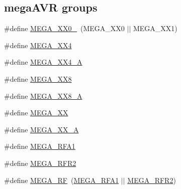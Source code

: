 \subsection*{mega\+A\+V\+R groups}
\begin{DoxyCompactItemize}
\item 
\#define \hyperlink{group__mega__part__macros__group_ga59ba73abcf65d3d398e7d37d78c271fe}{M\+E\+G\+A\+\_\+\+X\+X0\+\_}~(M\+E\+G\+A\+\_\+\+X\+X0 $\vert$$\vert$ M\+E\+G\+A\+\_\+\+X\+X1)
\item 
\#define \hyperlink{group__mega__part__macros__group_gadcf5297df4d3d2f2bb5ccd7d6e3578b6}{M\+E\+G\+A\+\_\+\+X\+X4}
\item 
\#define \hyperlink{group__mega__part__macros__group_gaf7dde20cbd5a8e5d53438e8dfac074a2}{M\+E\+G\+A\+\_\+\+X\+X4\+\_\+\+A}
\item 
\#define \hyperlink{group__mega__part__macros__group_ga47583caa82990781cd23a8495710ef31}{M\+E\+G\+A\+\_\+\+X\+X8}
\item 
\#define \hyperlink{group__mega__part__macros__group_gadb4a50447f658e564b640ca248e85b51}{M\+E\+G\+A\+\_\+\+X\+X8\+\_\+\+A}
\item 
\#define \hyperlink{group__mega__part__macros__group_gabdf992a84b61d19055315a473c2e0f20}{M\+E\+G\+A\+\_\+\+X\+X}
\item 
\#define \hyperlink{group__mega__part__macros__group_ga2b23bf35c1439ec05ddac769a8d8d1f8}{M\+E\+G\+A\+\_\+\+X\+X\+\_\+\+A}
\item 
\#define \hyperlink{group__mega__part__macros__group_gaa301ab9851fc885a2d07f5df47d0a893}{M\+E\+G\+A\+\_\+\+R\+F\+A1}
\item 
\#define \hyperlink{group__mega__part__macros__group_gaa5278eedfdfffaeb7c2c49aff7c2eb97}{M\+E\+G\+A\+\_\+\+R\+F\+R2}
\item 
\#define \hyperlink{group__mega__part__macros__group_ga1d762b037d9532cdfbc28404113aa480}{M\+E\+G\+A\+\_\+\+R\+F}~(\hyperlink{group__mega__part__macros__group_gaa301ab9851fc885a2d07f5df47d0a893}{M\+E\+G\+A\+\_\+\+R\+F\+A1} $\vert$$\vert$ \hyperlink{group__mega__part__macros__group_gaa5278eedfdfffaeb7c2c49aff7c2eb97}{M\+E\+G\+A\+\_\+\+R\+F\+R2})
\end{DoxyCompactItemize}
